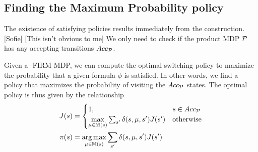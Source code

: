 \documentclass[conference]{IEEEtran}
\newcommand{\sofie}[1]{{\color{purple} [Sofie] #1}}
\begin{document}
\subsection{Finding the Maximum Probability policy}
The existence of satisfying policies results immediately from the construction.
\sofie{[This isn't obvious to me]}
We only need to check if the product MDP $\mathcal{P}$ has any accepting transitions $Acc_{\mathcal{P}}$.

Given a \DTL-FIRM MDP, we can compute the optimal switching policy to maximize the probability that a given formula $\phi$ is satisfied.  
%
%
In other words, we find a policy that maximizes the probability of visiting the $Acc_{\mathcal{P}}$ states.
The optimal policy is thus given by the relationship
\begin{align}
J(s) &= \begin{cases}
1, &  s \in Acc_\PA \\ 
\underset{\mu \in \mathbb{M}(s)}{\max} \sum_{s'} \delta(s,\mu,s')J(s') & \text{otherwise} 
\end{cases}  \label{eq:product-DP}\\
\pi(s) &= \underset{\mu \in \mathbb{M}(s)}{\arg \max} \sum_{s'} \delta(s,\mu,s')J(s')
\end{align}
\end{document}
